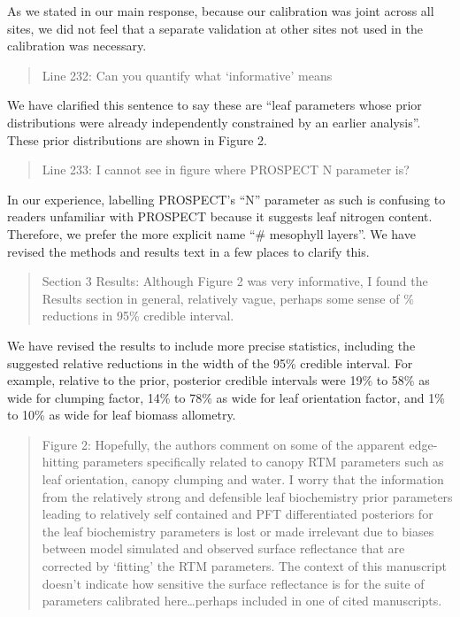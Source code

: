 As we stated in our main response, because our calibration was joint across all sites, we did not feel that a separate validation at other sites not used in the calibration was necessary.

\begin{quote}
  Line 232: Can you quantify what ‘informative’ means
\end{quote}

We have clarified this sentence to say these are “leaf parameters whose prior distributions were already independently constrained by an earlier analysis”. These prior distributions are shown in Figure 2.

\begin{quote}
  Line 233: I cannot see in figure where PROSPECT N parameter is?
\end{quote}

In our experience, labelling PROSPECT’s “N” parameter as such is confusing to readers unfamiliar with PROSPECT because it suggests leaf nitrogen content. Therefore, we prefer the more explicit name “\# mesophyll layers”. We have revised the methods and results text in a few places to clarify this.

\begin{quote}
  Section 3 Results: Although Figure 2 was very informative, I found the Results section in general, relatively vague, perhaps some sense of \% reductions in 95\% credible interval.
\end{quote}

We have revised the results to include more precise statistics, including the suggested relative reductions in the width of the 95\% credible interval. For example, relative to the prior, posterior credible intervals were 19\% to 58\% as wide for clumping factor, 14\% to 78\% as wide for leaf orientation factor, and 1\% to 10\% as wide for leaf biomass allometry.

\begin{quote}
  Figure 2: Hopefully, the authors comment on some of the apparent edge-hitting parameters specifically related to canopy RTM parameters such as leaf orientation, canopy clumping and water. I worry that the information from the relatively strong and defensible leaf biochemistry prior parameters leading to relatively self contained and PFT differentiated posteriors for the leaf biochemistry parameters is lost or made irrelevant due to biases between model simulated and observed surface reflectance that are corrected by ‘fitting’ the RTM parameters. The context of this manuscript doesn’t indicate how sensitive the surface reflectance is for the suite of parameters calibrated here\ldots perhaps included in one of cited manuscripts.
\end{quote}

